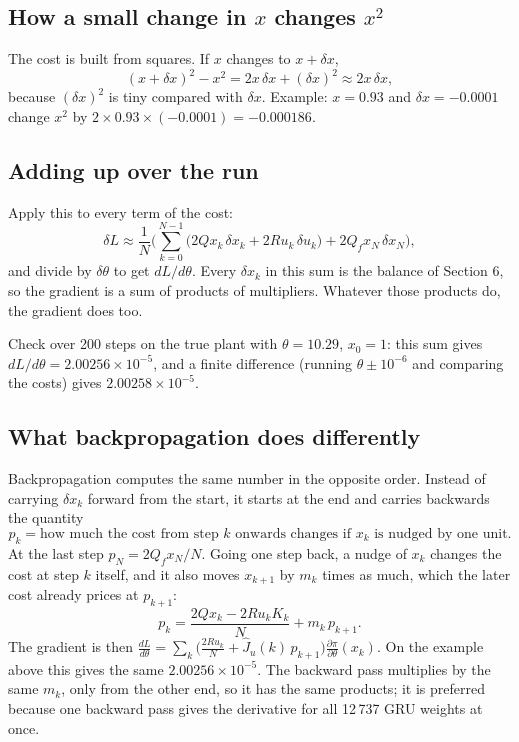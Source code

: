 \documentclass[11pt]{article}
\begin{document}
\subsection{How a small change in $x$ changes $x^2$}

The cost is built from squares. If $x$ changes to $x+\delta x$,
\begin{equation}
(x+\delta x)^2-x^2=2x\,\delta x+(\delta x)^2\approx2x\,\delta x ,
\end{equation}
because $(\delta x)^2$ is tiny compared with $\delta x$. Example: $x=0.93$ and $\delta x=-0.0001$ change $x^2$ by $2\times0.93\times(-0.0001)=-0.000186$.

\subsection{Adding up over the run}

Apply this to every term of the cost:
\begin{equation}
\delta L\approx\frac1N\Big(\sum_{k=0}^{N-1}\big(2Qx_k\,\delta x_k+2Ru_k\,\delta u_k\big)+2Q_fx_N\,\delta x_N\Big),
\end{equation}
and divide by $\delta\theta$ to get $dL/d\theta$. Every $\delta x_k$ in this sum is the balance of Section 6, so the gradient is a sum of products of multipliers. Whatever those products do, the gradient does too.

Check over 200 steps on the true plant with $\theta=10.29$, $x_0=1$: this sum gives $dL/d\theta=2.00256\times10^{-5}$, and a finite difference (running $\theta\pm10^{-6}$ and comparing the costs) gives $2.00258\times10^{-5}$.

\subsection{What backpropagation does differently}

Backpropagation computes the same number in the opposite order. Instead of carrying $\delta x_k$ forward from the start, it starts at the end and carries backwards the quantity
\begin{equation}
p_k=\text{how much the cost from step $k$ onwards changes if $x_k$ is nudged by one unit.}
\end{equation}
At the last step $p_N=2Q_fx_N/N$. Going one step back, a nudge of $x_k$ changes the cost at step $k$ itself, and it also moves $x_{k+1}$ by $m_k$ times as much, which the later cost already prices at $p_{k+1}$:
\begin{equation}
p_k=\frac{2Qx_k-2Ru_kK_k}{N}+m_k\,p_{k+1}.
\end{equation}
The gradient is then $\frac{dL}{d\theta}=\sum_k\big(\frac{2Ru_k}{N}+\hat J_u(k)\,p_{k+1}\big)\frac{\partial\pi}{\partial\theta}(x_k)$. On the example above this gives the same $2.00256\times10^{-5}$. The backward pass multiplies by the same $m_k$, only from the other end, so it has the same products; it is preferred because one backward pass gives the derivative for all 12\,737 GRU weights at once.
\end{document}
